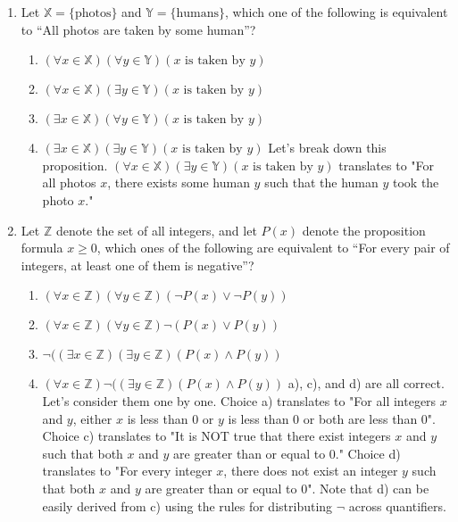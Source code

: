 \documentclass[11pt, preview]{standalone} %
\begin{document}
\begin{enumerate}
\item
Let $\mathbb{X} = \{\text{photos}\}$ and 
$\mathbb{Y} = \{\text{humans}\}$, which one of the 
following is equivalent to 
``All photos are taken by some human''?
\begin{Choices}
  \begin{enumerate}
  \FalseChoice\item $(\forall x \in \mathbb{X})(\forall y \in \mathbb{Y})(x\text{ is taken by }y)$
  \TrueChoice\item $(\forall x \in \mathbb{X})(\exists y \in \mathbb{Y})(x\text{ is taken by }y)$
  \FalseChoice\item $(\exists x \in \mathbb{X})(\forall y \in \mathbb{Y})(x\text{ is taken by }y)$
  \FalseChoice\item $(\exists x \in \mathbb{X})(\exists y \in \mathbb{Y})(x\text{ is taken by }y)$
  \Solution Let's break down this proposition. $(\forall x \in \mathbb{X})(\exists y \in \mathbb{Y})(x \text{ is taken by } y)$ translates to "For all photos $x$, there exists some human $y$ such that the human $y$ took the photo $x$."
  \end{enumerate}
\end{Choices}


\item
Let $\mathbb{Z}$ denote the set of all integers, and let
$P(x)$ denote the proposition formula $x \geq 0$, which ones of the
following are equivalent to ``For every pair of integers, at least one
of them is negative''?
\begin{Multi}
  \begin{enumerate}
    \TrueChoice\item $(\forall x \in \mathbb{Z})(\forall y \in \mathbb{Z})(\lnot P(x) \lor \lnot P(y))$
    \FalseChoice\item $(\forall x \in \mathbb{Z})(\forall y \in \mathbb{Z})\lnot (P(x) \lor P(y))$
    \TrueChoice\item $\lnot ((\exists x \in \mathbb{Z})(\exists y \in \mathbb{Z})(P(x) \land P(y))$
    \TrueChoice\item $(\forall x \in \mathbb{Z})\lnot ((\exists y \in \mathbb{Z})(P(x) \land P(y))$
    \Solution a), c), and d) are all correct. Let's consider them one by one. Choice a) translates to "For all integers $x$ and $y$, either $x$ is less than 0 or $y$ is less than 0 or both are less than 0". Choice c) translates to "It is NOT true that there exist integers $x$ and $y$ such that both $x$ and $y$ are greater than or equal to 0." Choice d) translates to "For every integer $x$, there does not exist an integer $y$ such that both $x$ and $y$ are greater than or equal to 0". Note that d) can be easily derived from c) using the rules for distributing $\lnot$ across quantifiers. 
  \end{enumerate}
\end{Multi}


\end{enumerate}
\end{document}
